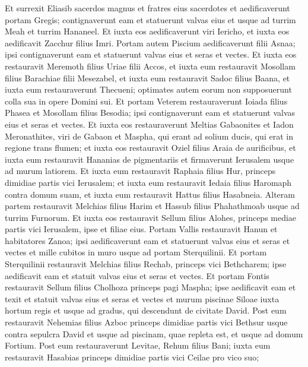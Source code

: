\begin{biblechapter}
\begin{biblechapter}
\begin{biblechapter}
\verse Et surrexit Eliasib sacerdos magnus et fratres eius sacerdotes et aedificaverunt portam Gregis; contignaverunt eam et statuerunt valvas eius et usque ad turrim Meah et turrim Hananeel. 
\verse Et iuxta eos aedificaverunt viri Iericho, et iuxta eos aedificavit Zacchur filius Imri.
 \verse Portam autem Piscium aedificaverunt filii Asnaa; ipsi contignaverunt eam et statuerunt valvas eius et seras et vectes. 
\verse Et iuxta eos restauravit Meremoth filius Uriae filii Accos, et iuxta eum restauravit Mosollam filius Barachiae filii Mesezabel, et iuxta eum restauravit Sadoc filius Baana, 
\verse et iuxta eum restauraverunt Thecueni; optimates autem eorum non supposuerunt colla sua in opere Domini sui.
 \verse Et portam Veterem restauraverunt Ioiada filius Phasea et Mosollam filius Besodia; ipsi contignaverunt eam et statuerunt valvas eius et seras et vectes. 
 \verse Et iuxta eos restauraverunt Meltias Gabaonites et Iadon Meronathites, viri de Gabaon et Maspha, qui erant ad solium ducis, qui erat in regione trans flumen; 
 \verse et iuxta eos restauravit Oziel filius Araia de aurificibus, et iuxta eum restauravit Hananias de pigmentariis et firmaverunt Ierusalem usque ad murum latiorem. 
\verse Et iuxta eum restauravit Raphaia filius Hur, princeps dimidiae partis vici Ierusalem; 
\verse et iuxta eum restauravit Iedaia filius Haromaph contra domum suam, et iuxta eum restauravit Hattus filius Hasabneia. 
\verse Alteram partem restauravit Melchias filius Harim et Hassub filius Phahathmoab usque ad turrim Furnorum. 
\verse Et iuxta eos restauravit Sellum filius Alohes, princeps mediae partis vici Ierusalem, ipse et filiae eius.
 \verse Portam Vallis restauravit Hanun et habitatores Zanoa; ipsi aedificaverunt eam et statuerunt valvas eius et seras et vectes et mille cubitos in muro usque ad portam Sterquilinii. 
\verse Et portam Sterquilinii restauravit Melchias filius Rechab, princeps vici Bethcharem; ipse aedificavit eam et statuit valvas eius et seras et vectes.
 \verse Et portam Fontis restauravit Sellum filius Cholhoza princeps pagi Maspha; ipse aedificavit eam et texit et statuit valvas eius et seras et vectes et murum piscinae Siloae iuxta hortum regis et usque ad gradus, qui descendunt de civitate David. 
\verse Post eum restauravit Nehemias filius Azboc princeps dimidiae partis vici Bethsur usque contra sepulcra David et usque ad piscinam, quae repleta est, et usque ad domum Fortium. 
\verse Post eum restauraverunt Levitae, Rehum filius Bani; iuxta eum restauravit Hasabias princeps dimidiae partis vici Ceilae pro vico suo; 

\end{biblechapter}
\end{biblechapter}
\end{biblechapter}
